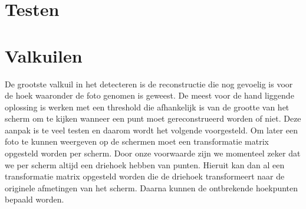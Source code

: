 \section{Testen} \label{Testen}


\section{Valkuilen} \label{Valkuilen}
De grootste valkuil in het detecteren is de reconstructie die nog gevoelig is voor de hoek waaronder de foto genomen is geweest. De meest voor de hand liggende oplossing is werken met een threshold die afhankelijk is van de grootte van het scherm om te kijken wanneer een punt moet gereconstrueerd worden of niet. Deze aanpak is te veel testen en daarom wordt het volgende voorgesteld. Om later een foto te kunnen weergeven op de schermen moet een transformatie matrix opgesteld worden per scherm. Door onze voorwaarde zijn we momenteel zeker dat we per scherm altijd een driehoek hebben van punten. Hieruit kan dan al een transformatie matrix opgesteld worden die de driehoek transformeert naar de originele afmetingen van het scherm. Daarna kunnen de ontbrekende hoekpunten bepaald worden. 
